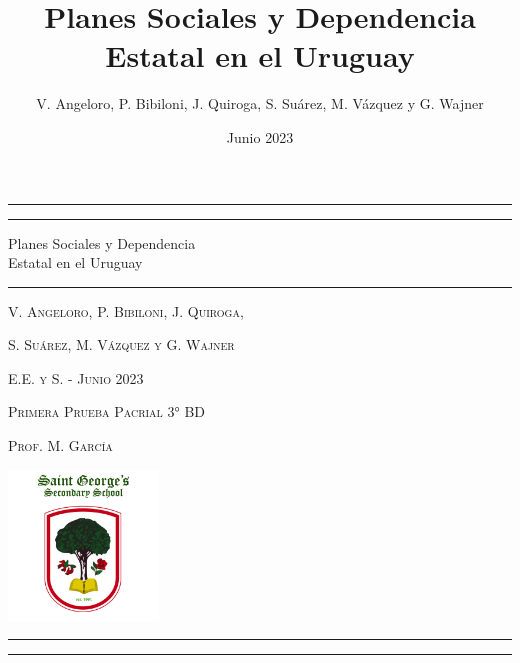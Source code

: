\documentclass{article}
\title{Planes Sociales y Dependencia Estatal en el Uruguay
	}
\author{V. Angeloro, P. Bibiloni, J. Quiroga, S. Suárez, M. Vázquez y G. Wajner}
\date{Junio 2023}
\begin{document}
\begin{titlepage}
	
	\centering
	
	\rule{\textwidth}{1pt}
	\vspace{2pt}\vspace{-\baselineskip}
	\rule{\textwidth}{0.4pt}

	\vspace{0.1\textheight}
	
	{\Huge Planes Sociales y Dependencia}\\[0.5\baselineskip]
	{\Huge Estatal en el Uruguay}
	
	\vspace{0.025\textheight}
	
	\rule{0.3\textwidth}{0.4pt}
	
	\vspace{0.037\textheight}
	{\Large \textsc{V. Angeloro, P. Bibiloni, J. Quiroga,}}

  \vspace{0.1cm}

  {\Large \textsc{S. Suárez, M. Vázquez y G. Wajner}}

  \vfill
	
  \large\textsc{E.E. y S. - Junio 2023}

  \vspace{-0.2cm}

  \large\textsc{Primera Prueba Pacrial 3° BD}

  \vspace{-0.2cm}

  \large\textsc{Prof. M. García}

  \vspace{0.05\textheight}

	\includegraphics[width=0.3\textwidth]{logo.jpg}
	
  \vspace{0.08\textheight}

	\rule{\textwidth}{0.4pt}
	
	\vspace{2pt}\vspace{-\baselineskip}
	
	\rule{\textwidth}{1pt}
	
\end{titlepage}
\end{document}
